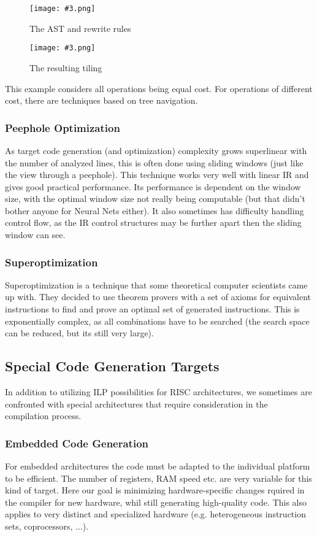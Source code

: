 \documentclass{article}
\newcommand{\fig}[4]{
	\begin{figure}[#1]
		\center
		\texttt{[image: \#3.png]}
		\caption{#4}
		\label{fig:#3}
	\end{figure}
	}
\begin{document}
\fig{h}{}{slideast}{The AST and rewrite rules}

\fig{h}{}{slidetiling}{The resulting tiling}

\begin{keypointbox}
	This example considers all operations being equal cost.
	For operations of different cost, there are techniques based on tree navigation.
\end{keypointbox}

\subsubsection{Peephole Optimization}
As target code generation (and optimization) complexity grows superlinear with the number of analyzed lines, this is often done using sliding windows (just like the view through a peephole).
This technique works very well with linear IR and gives good practical performance.
Its performance is dependent on the window size, with the optimal window size not really being computable (but that didn't bother anyone for Neural Nets either).
It also sometimes has difficulty handling control flow, as the IR control structures may be further apart then the sliding window can see.

\subsubsection{Superoptimization}
Superoptimization is a technique that some theoretical computer scientists came up with.
They decided to use theorem provers with a set of axioms for equivalent instructions to find and prove an optimal set of generated instructions.
This is exponentially complex, as all combinations have to be searched (the search space can be reduced, but its still very large).

\subsection{Special Code Generation Targets}
In addition to utilizing ILP possibilities for RISC architectures, we sometimes are confronted with special architectures that require consideration in the compilation process.

\subsubsection{Embedded Code Generation}
For embedded architectures the code must be adapted to the individual platform to be efficient.
The number of registers, RAM speed etc. are very variable for this kind of target.
Here our goal is minimizing hardware-specific changes rquired in the compiler for new hardware, whil still generating high-quality code.
This also applies to very distinct and specialized hardware (e.g. heterogeneous instruction sets, coprocessors, ...).
\end{document}
